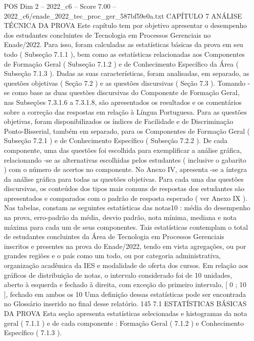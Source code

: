\begin{textsample}{POS Dim 2 – 2022\_c6 – Score 7.00 – 2022\_c6/enade\_2022\_tec\_proc\_ger\_587bf59e0a.txt}  \label{ex:f2_pos_133}
CAPÍTULO 7 ANÁLISE TÉCNICA DA PROVA Este capítulo tem por objetivo apresentar o desempenho dos estudantes concluintes de Tecnologia em Processos Gerenciais no Enade/2022.
Para isso, foram calculadas as estatísticas básicas da prova em seu todo ( Subseção 7.1.1 ), bem como as estatísticas relacionadas aos Componentes de Formação Geral ( Subseção 7.1.2 ) e de Conhecimento Específico da Área ( Subseção 7.1.3 ).
Dadas as suas características, foram analisadas, em separado, as questões objetivas ( Seção 7.2 ) e as questões discursivas ( Seção 7.3 ).
Tomando -se como base as duas questões discursivas do Componente de Formação Geral, nas Subseções 7.3.1.6 a 7.3.1.8, são apresentados os resultados e os comentários sobre a correção das respostas em relação à Língua Portuguesa.
Para as questões objetivas, foram disponibilizados os índices de Facilidade e de Discriminação Ponto-Bisserial, também em separado, para os Componentes de Formação Geral ( Subseção 7.2.1 ) e de Conhecimento Específico ( Subseção 7.2.2 ).
De cada componente, uma das questões foi escolhida para exemplificar a análise gráfica, relacionando -se as alternativas escolhidas pelos estudantes ( inclusive o gabarito ) com o número de acertos no componente.
No Anexo IV, apresenta -se a íntegra da análise gráfica para todas as questões objetivas.
Para cada uma das questões discursivas, os conteúdos dos tipos mais comuns de respostas dos estudantes são apresentados e comparados com o padrão de resposta esperado ( ver Anexo IX ).
Nas tabelas, constam as seguintes estatísticas das notas10 : média do desempenho na prova, erro-padrão da média, desvio padrão, nota mínima, mediana e nota máxima para cada um de seus componentes.
Tais estatísticas contemplam o total de estudantes concluintes da Área de Tecnologia em Processos Gerenciais inscritos e presentes na prova do Enade/2022, tendo em vista agregações, ou por grandes regiões e o país como um todo, ou por categoria administrativa, organização acadêmica da IES e modalidade de oferta dos cursos.
Em relação aos gráficos de distribuição de notas, o intervalo considerado foi de 10 unidades, aberto à esquerda e fechado à direita, com exceção do primeiro intervalo, [ 0 ; 10 ], fechado em ambos os 10 Uma definição dessas estatísticas pode ser encontrada no Glossário inserido no final desse relatório. 145 7.1 ESTATÍSTICAS BÁSICAS DA PROVA Esta seção apresenta estatísticas selecionadas e histogramas da nota geral ( 7.1.1 ) e de cada componente : Formação Geral ( 7.1.2 ) e Conhecimento Específico ( 7.1.3 ).

\end{textsample}

